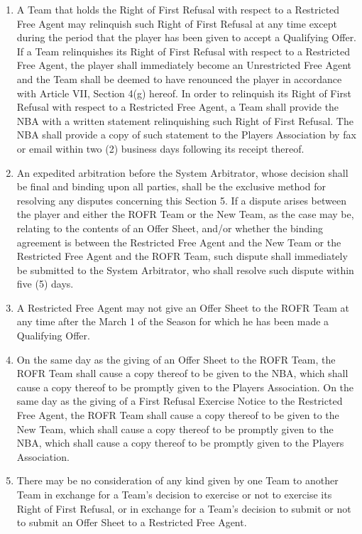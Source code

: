 \documentclass[
]{book}
\begin{document}
\begin{enumerate}
\item
  A Team that holds the Right of First Refusal with respect to a Restricted Free Agent may relinquish such Right of First Refusal at any time except during the period that the player has been given to accept a Qualifying Offer. If a Team relinquishes its Right of First Refusal with respect to a Restricted Free Agent, the player shall immediately become an Unrestricted Free Agent and the Team shall be deemed to have renounced the player in accordance with Article VII, Section 4(g) hereof. In order to relinquish its Right of First Refusal with respect to a Restricted Free Agent, a Team shall provide the NBA with a written statement relinquishing such Right of First Refusal. The NBA shall provide a copy of such statement to the Players Association by fax or email within two (2) business days following its receipt thereof.
\item
  An expedited arbitration before the System Arbitrator, whose decision shall be final and binding upon all parties, shall be the exclusive method for resolving any disputes concerning this Section 5. If a dispute arises between the player and either the ROFR Team or the New Team, as the case may be, relating to the contents of an Offer Sheet, and/or whether the binding agreement is between the Restricted Free Agent and the New Team or the Restricted Free Agent and the ROFR Team, such dispute shall immediately be submitted to the System Arbitrator, who shall resolve such dispute within five (5) days.
\item
  A Restricted Free Agent may not give an Offer Sheet to the ROFR Team at any time after the March 1 of the Season for which he has been made a Qualifying Offer.
\item
  On the same day as the giving of an Offer Sheet to the ROFR Team, the ROFR Team shall cause a copy thereof to be given to the NBA, which shall cause a copy thereof to be promptly given to the Players Association. On the same day as the giving of a First Refusal Exercise Notice to the Restricted Free Agent, the ROFR Team shall cause a copy thereof to be given to the New Team, which shall cause a copy thereof to be promptly given to the NBA, which shall cause a copy thereof to be promptly given to the Players Association.
\item
  There may be no consideration of any kind given by one Team to another Team in exchange for a Team's decision to exercise or not to exercise its Right of First Refusal, or in exchange for a Team's decision to submit or not to submit an Offer Sheet to a Restricted Free Agent.

\end{enumerate}
\end{document}
